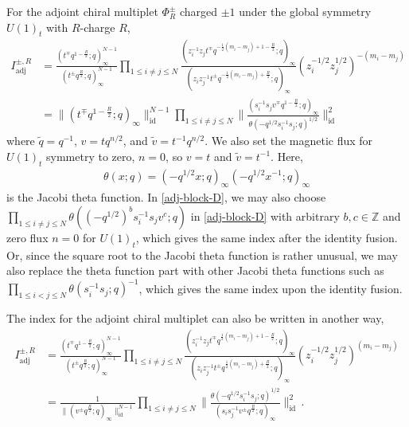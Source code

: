 \documentclass[11pt,hyper,a4paper]{article}
\begin{document}
For the adjoint chiral multiplet $\Phi_{R}^{\pm}$ charged $\pm1$ under the global symmetry $U(1)_t$ with $R$-charge $R$,
\begin{align}
I^{\pm,R}_{\text{adj}} &= \frac{( t^{\mp} q^{ 1 -\frac{R}{2} };q)^{N-1}_\infty}{( t^{\pm}  q^{\frac{R}{2} };q)_\infty^{N-1}}  
\prod_{1\leq i \neq j \leq N} \frac{(z_i^{-1} z_j t^{\mp} q^{-\frac{1}{2} (m_i-m_j) +1 -\frac{R}{2} };q)_\infty}{(z_i z_j^{-1} t^{\pm}  q^{-\frac{1}{2} (m_i-m_j) +\frac{R}{2} };q)_\infty} (z_i^{-1/2} z_j^{1/2})^{-(m_i-m_j)}		\label{adj-factor-D}	\\
&= \|( t^{\mp} q^{ 1 -\frac{R}{2} };q)_\infty \|_{\text{id}}^{N-1}
\prod_{1\leq i \neq j \leq N} \bigg\| \frac{(s_i^{-1} s_j v^{\mp} q^{1 -\frac{R}{2} };q)_\infty }{\theta(-q^{1/2} s_i^{-1} s_j;q)^{1/2}} \bigg\|_{\text{id}}^2	\label{adj-block-D}
\end{align}
where $\tilde{q}=q^{-1}$, $v=t q^{n/2}$, and $\tilde{v}=t^{-1} q^{n/2}$.
We also set the magnetic flux for $U(1)_t$ symmetry to zero, $n=0$, so $v=t$ and $\tilde{v}=t^{-1}$.
Here, 
\begin{align}
\theta(x;q) = (-q^{1/2} x ;q)_\infty (-q^{1/2} x^{-1};q)_\infty
\end{align} 
is the Jacobi theta function.
In \eqref{adj-block-D}, we may also choose $\prod_{1 \leq i \neq j \leq N} \theta((-q^{1/2})^b s_i^{-1} s_j v^{c} ;q)$ in \eqref{adj-block-D} with arbitrary $b, c \in \mathbb{Z}$ and zero flux $n=0$ for $U(1)_t$, which gives the same index after the identity fusion.
Or, since the square root to the Jacobi theta function is rather unusual, we may also replace the theta function part with other Jacobi theta functions such as $\prod_{1 \leq i < j \leq N} \theta(s_i^{-1} s_j;q)^{-1}$, which gives the same index upon the identity fusion.	


The index for the adjoint chiral multiplet can also be written in another way,
\begin{align}
I^{\pm,R}_{\text{adj}} &= \frac{( t^{\mp} q^{ 1 -\frac{R}{2} };q)^{N-1}_\infty}{( t^{\pm}  q^{\frac{R}{2} };q)_\infty^{N-1}} 
\prod_{1\leq i \neq j \leq N} \frac{(z_i^{-1} z_j t^{\mp} q^{\frac{1}{2} (m_i-m_j) +1 -\frac{R}{2} };q)_\infty}{(z_i z_j^{-1} t^{\pm}  q^{\frac{1}{2} (m_i-m_j) +\frac{R}{2} };q)_\infty} (z_i^{-1/2} z_j^{1/2})^{(m_i-m_j)}	\label{adj-factor-N}	\\
&= \frac{1}{ \| ( v^{\pm}  q^{\frac{R}{2} };q)_\infty \|_{\text{id}}^{N-1} }  
\prod_{1\leq i \neq j \leq N} \bigg\| \frac{\theta(-q^{1/2} s_i^{-1} s_j;q)^{1/2}}{(s_i s_j^{-1} v^{\pm} q^{\frac{R}{2} };q)_\infty } \bigg\|_{\text{id}}^2	\,	.	\label{adj-block-N}
\end{align}
\end{document}
